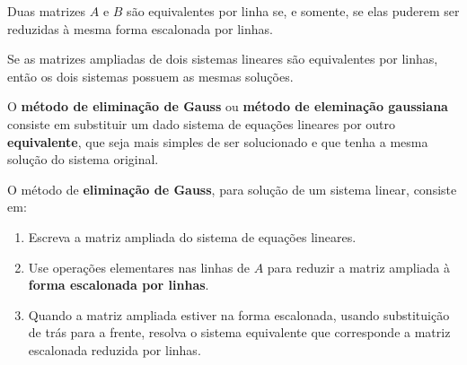 \documentclass{beamer}
\begin{document}
    \begin{frame}
        \begin{teorema}
            Duas matrizes $A$ e $B$ são equivalentes por linha se, e somente, se elas puderem ser reduzidas à mesma forma escalonada por linhas.
        \end{teorema}
    \end{frame}

    \begin{frame}
        \begin{teorema}
            Se as matrizes ampliadas de dois sistemas lineares são equivalentes por linhas, então os dois sistemas possuem as mesmas soluções.
        \end{teorema}
    \end{frame}

    \begin{frame}
        O \textbf{método de eliminação de Gauss} ou \textbf{método de eleminação gaussiana} consiste em substituir um dado sistema de equações lineares por outro \textbf{equivalente}, que seja mais simples de ser solucionado e que tenha a mesma solução do sistema original.

        \begin{definicao}
            O método de \textbf{eliminação de Gauss}, para solução de um sistema linear, consiste em:
            \begin{enumerate}[label={\roman*})]
                \item Escreva a matriz ampliada do sistema de equações lineares.

                \item Use operações elementares nas linhas de $A$ para reduzir a matriz ampliada à \textbf{forma escalonada por linhas}.
                
                \item Quando a matriz ampliada estiver na forma escalonada, usando substituição de trás para a frente, resolva o sistema equivalente que corresponde a matriz escalonada reduzida por linhas.
            \end{enumerate}
        \end{definicao}
    \end{frame}
    
\end{document}
